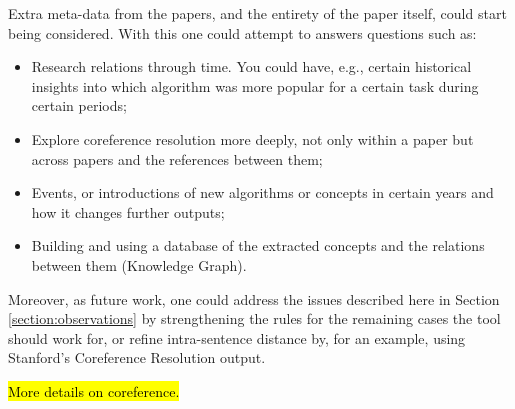 \documentclass[11pt,a4paper,openright]{memoir}
\begin{document}
Extra meta-data from the papers, and the entirety of the paper itself, could start being considered. With this one could attempt to answers questions such as:
	\begin{itemize}
	  \item Research relations through time. You could have, e.g., certain historical insights into which algorithm was more popular for a certain task during certain periods;
	  \item Explore coreference resolution more deeply, not only within a paper but across papers and the references between them;
	  \item Events, or introductions of new algorithms or concepts in certain years and how it changes further outputs;
	  \item Building and using a database of the extracted concepts and the relations between them (Knowledge Graph).
	\end{itemize}

Moreover, as future work, one could address the issues described here in Section \ref{section:observations} by strengthening the rules for the remaining cases the tool should work for, or refine intra-sentence distance by, for an example, using Stanford's Coreference Resolution output.

\hl{More details on coreference.}

\backmatter

\printbibliography

\appendix
\end{document}
